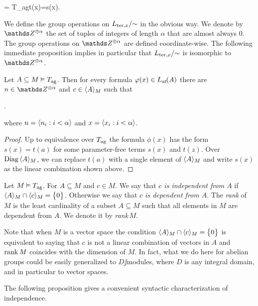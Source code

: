 \documentclass[creche.tex]{subfiles}
\begin{document}
%
{=}%
{T_{\rm ag}\proves t(x)=s(x).}

We define the group operations on $L_{{\rm ter},x}/\mathord{\sim}$ in the obvious way. We denote by $\ZZ^{\oplus\alpha}$ the set of tuples of integers of length $\alpha$ that are almost always $0$. The group operations on $\ZZ^{\oplus\alpha}$ are defined coordinate-wise. The following immediate proposition implies in particular that  $L_{{\rm ter},x}/\mathord{\sim}$ is isomorphic to $\ZZ^{\oplus\alpha}$.

\begin{proposition}
\label{corol_formacanonicaterminimoduli}
Let $A\subseteq M\models T_{\rm ag}$. Then for every formula $\phi(x)\in\atL(A)$ there are $n\in\ZZ^{\oplus\alpha}$ and $c\in\<A\>_M$ such that 

.

where $n=\<n_i:i<\alpha\>$ and  $x=\<x_i:i<\alpha\>$.\QED

\end{proposition}

\begin{proof}
Up to equivalence over $T_{\rm ag}$ the formula $\phi(x)$ has the form $s(x)=t(a)$ for some parameter-free terms $s(x)$ and $t(z)$. Over $\Diag\,\<A\>_M$, we can replace $t(a)$ with a single element of  $\<A\>_M$ and write $s(x)$ as the linear combination shown above.
\end{proof}


\begin{definition} Let $M\models T_{\rm ag}$. For $A\subseteq M$ and  $c\in M$. We say that  \emph{$c$ is independent from $A$\/} if $\<A\>_M\cap\<c\>_M=\big\{0\big\}$. Otherwise we say that \emph{$c$ is dependent from $A$}. The \emph{rank\/} of $M$ is the least cardinality of a subset $A\subseteq M$ such that all elements in $M$ are dependent from $A$. We denote it by \emph{rank\,$M$}.\QED
\end{definition}  

Note that when $M$ is a vector space the condition $\<A\>_M\cap\<c\>_M=\big\{0\big\}$ is equivalent to saying that $c$ is not a linear combination of vectors in $A$ and $\rank M$ coincides with the dimension of $M$. In fact, what we do here for abelian groups could be easily generalized to $D\jj$modules, where $D$ is any integral domain, and in particular to vector spaces.

The following proposition gives a convenient syntactic characterization of independence.
\end{document}

